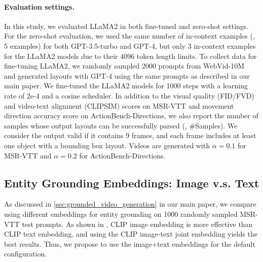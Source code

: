 \paragraph{Evaluation settings.} In this study, we evaluated LLaMA2 in both fine-tuned and zero-shot settings. For the zero-shot evaluation, we used the same number of in-context examples (\ie, 5 examples) for both GPT-3.5-turbo and GPT-4, but only 3 in-context examples for the LLaMA2 models due to their 4096 token length limits. To collect data for fine-tuning LLaMA2, we randomly sampled 2000 prompts from WebVid-10M~\citep{bain2021frozen} and generated layouts with GPT-4 using the same prompts as described in our main paper. We fine-tuned the LLaMA2 models for 1000 steps with a learning rate of 2e-4 and a cosine scheduler. In addition to the visual quality (FID/FVD) and video-text alignment (CLIPSIM) scores on MSR-VTT and movement direction accuracy score on ActionBench-Directions, we also report the number of samples whose output layouts can be successfully parsed (\eg, \#Samples).
We consider the output valid if it contains 9 frames, and each frame includes at least one object with a bounding box layout. Videos are generated with $\alpha=0.1$ for MSR-VTT and $\alpha=0.2$ for ActionBench-Directions.















\subsection{Entity Grounding Embeddings: Image v.s. Text}
As discussed in \cref{sec:grounded_video_generation} in our main paper,
we compare using different embeddings for entity grounding on 1000 randomly sampled MSR-VTT test prompts.
As shown in ,
CLIP image embedding is more effective than CLIP text embedding,
and using the CLIP image-text joint embedding yields the best results.
Thus, we propose to use the image+text embeddings for the default configuration.


